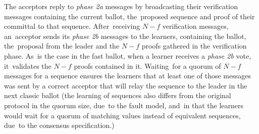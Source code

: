 \documentclass[algorithms,article,accept,moreauthors,pdftex,10pt,a4paper]{Definitions/mdpi}
\begin{document}
The acceptors reply to \textit{phase 2a} messages by broadcasting their verification messages containing the current ballot, the~proposed sequence and proof of their committal to that sequence. After~receiving $N-f$ verification messages, an~acceptor sends its \textit{phase 2b} messages to the learners, containing the ballot, the~proposal from the leader and the $N-f$ proofs gathered in the verification phase. As~is the case in the fast ballot, when a learner receives a \textit{phase 2b} vote, it~validates the $N-f$ proofs contained in it. Waiting~for a quorum of $N-f$ messages for a sequence ensures the learners that at least one of those messages was sent by a correct acceptor that will relay the sequence to the leader in the next classic ballot (the learning of sequences also differs from the original protocol in the quorum size, due~to the fault model, and~in that the learners would wait for a quorum of matching values instead of equivalent sequences, due~to the consensus specification.)\par
\end{document}
